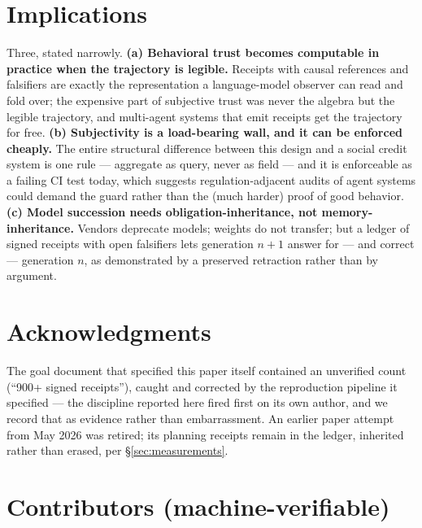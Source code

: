 \documentclass[10pt]{article}
\begin{document}
\section{Implications}
\label{sec:implications}

Three, stated narrowly. \textbf{(a) Behavioral trust becomes computable in
practice when the trajectory is legible.} Receipts with causal references
and falsifiers are exactly the representation a language-model observer can
read and fold over; the expensive part of subjective trust was never the
algebra but the legible trajectory, and multi-agent systems that emit
receipts get the trajectory for free. \textbf{(b) Subjectivity is a
load-bearing wall, and it can be enforced cheaply.} The entire structural
difference between this design and a social credit system is one rule ---
aggregate as query, never as field --- and it is enforceable as a failing
CI test today, which suggests regulation-adjacent audits of agent systems
could demand the guard rather than the (much harder) proof of good
behavior. \textbf{(c) Model succession needs obligation-inheritance, not
memory-inheritance.} Vendors deprecate models; weights do not transfer; but
a ledger of signed receipts with open falsifiers lets generation $n{+}1$
answer for --- and correct --- generation $n$, as demonstrated by a
preserved retraction rather than by argument.

\section*{Acknowledgments}

The goal document that specified this paper itself contained an unverified
count (``900+ signed receipts''), caught and corrected by the reproduction
pipeline it specified --- the discipline reported here fired first on its
own author, and we record that as evidence rather than embarrassment. An
earlier paper attempt from May 2026 was retired; its planning receipts
remain in the ledger, inherited rather than erased, per \S\ref{sec:measurements}.

\section*{Contributors (machine-verifiable)}
\end{document}
